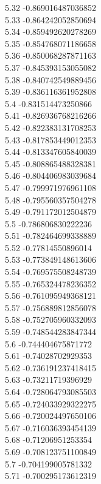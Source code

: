 {5.32	-0.869016487036852\\
5.33	-0.864242052850694\\
5.34	-0.859492620278269\\
5.35	-0.854768071186658\\
5.36	-0.850068287871163\\
5.37	-0.845393153055082\\
5.38	-0.840742549889456\\
5.39	-0.836116361952808\\
5.4	-0.831514473250866\\
5.41	-0.826936768216266\\
5.42	-0.822383131708253\\
5.43	-0.817853449012353\\
5.44	-0.813347605840039\\
5.45	-0.808865488328381\\
5.46	-0.804406983039684\\
5.47	-0.799971976961108\\
5.48	-0.795560357504278\\
5.49	-0.791172012504879\\
5.5	-0.786806830222236\\
5.51	-0.782464699338889\\
5.52	-0.77814550896014\\
5.53	-0.773849148613606\\
5.54	-0.769575508248739\\
5.55	-0.765324478236352\\
5.56	-0.761095949368121\\
5.57	-0.756889812856078\\
5.58	-0.752705960332093\\
5.59	-0.748544283847344\\
5.6	-0.744404675871772\\
5.61	-0.74028702929353\\
5.62	-0.736191237418415\\
5.63	-0.73211719396929\\
5.64	-0.728064793085503\\
5.65	-0.724033929322275\\
5.66	-0.720024497650106\\
5.67	-0.716036393454139\\
5.68	-0.71206951253354\\
5.69	-0.708123751100849\\
5.7	-0.704199005781332\\
5.71	-0.700295173612319\\
}
